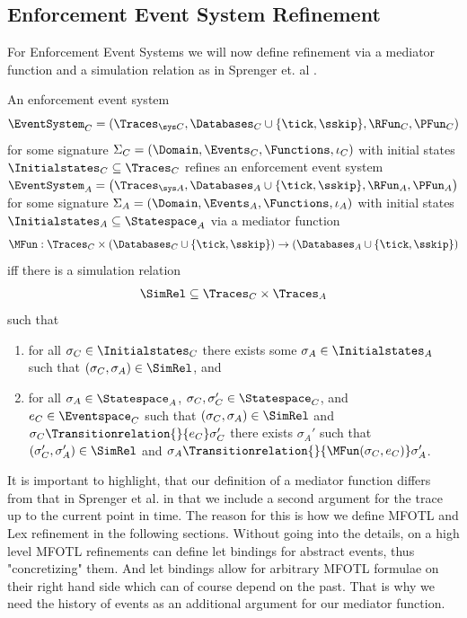 \subsection{Enforcement Event System Refinement}

For Enforcement Event Systems we will now define refinement
via a mediator function and a simulation relation as in Sprenger et. al \cite{igloo}.

\begin{definition}
    \label{def:enforcement-event-system-refinement}
    An enforcement event system
    $$\EventSystem_C =
    ( \Traces_{\sys C}, \Databases_C \cup \{\tick, \sskip \}, \RFun_C, \PFun_C )$$
    for some signature 
    $\Sigma_C = \left( \Domain, \Events_C, \Functions, \iota_C \right)$
    with initial states $\Initialstates_C \subseteq \Traces_C$
    refines an enforcement event system
    $\EventSystem_A = \left( \Traces_{\sys A}, \Databases_A \cup \{\tick, \sskip \}, \RFun_A, \PFun_A \right)$
    for some signature 
    $\Sigma_A = \left( \Domain, \Events_A, \Functions, \iota_A \right)$
    with initial states $\Initialstates_A \subseteq \Statespace_A$
    via a mediator function
    \begin{equation*}
        \MFun : \Traces_C \times (\Databases_C \cup \{ \tick, \sskip \})
        \to (\Databases_A \cup \{ \tick, \sskip \})
    \end{equation*}
    iff
    there is a simulation relation
    \begin{equation*}
        \SimRel \subseteq \Traces_C \times \Traces_A
    \end{equation*}
    such that
    \begin{enumerate}
        \item
            for all $\sigma_C \in \Initialstates_C$ there exists some
            $\sigma_A \in \Initialstates_A$ such that
            $(\sigma_C, \sigma_A) \in \SimRel$, and
        \item
            for all $\sigma_A \in \Statespace_A$,
            $\sigma_C, \sigma_C' \in \Statespace_C$, and
            $e_C \in \Eventspace_C$
            such that $(\sigma_C, \sigma_A) \in \SimRel$ and
            $\sigma_C \Transitionrelation{}{e_C} \sigma_C'$
            there exists $\sigma_A'$
            such that $(\sigma_C', \sigma_A') \in \SimRel$ and
            $\sigma_A \Transitionrelation{}{\MFun(\sigma_C, e_C)} \sigma_A'$.
    \end{enumerate}
    
\end{definition}
It is important to highlight, that our definition of a mediator function
differs from that in Sprenger et al. \cite{igloo} in that we include a second
argument for the trace up to the current point in time.
The reason for this is how we define MFOTL and Lex refinement in the following
sections.
Without going into the details, on a high level MFOTL refinements can define
let bindings for abstract events, thus "concretizing" them.
And let bindings allow for arbitrary MFOTL formulae on their right hand side which
can of course depend on the past.
That is why we need the history of events as an additional argument for our mediator
function.

